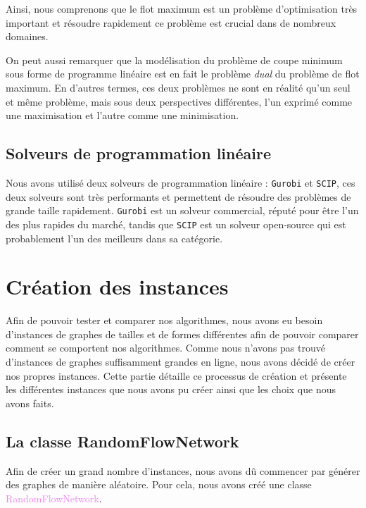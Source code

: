 \documentclass[a4paper]{article}
\begin{document}
Ainsi, nous comprenons que le flot maximum est un problème d'optimisation très important et résoudre rapidement ce problème est crucial dans de nombreux domaines.

On peut aussi remarquer que la modélisation du problème de coupe minimum sous forme de programme linéaire est en fait le problème \emph{dual} du problème de flot maximum. En d'autres termes, ces deux problèmes ne sont en réalité qu'un seul et même problème, mais sous deux perspectives différentes, l'un exprimé comme une maximisation et l'autre comme une minimisation.
\subsection{Solveurs de programmation linéaire}
Nous avons utilisé deux solveurs de programmation linéaire : \texttt{Gurobi} et \texttt{SCIP}, ces deux solveurs sont très performants et permettent de résoudre des problèmes de grande taille rapidement. \texttt{Gurobi} est un solveur commercial, réputé pour être l'un des plus rapides du marché, tandis que \texttt{SCIP} est un solveur open-source qui est probablement l'un des meilleurs dans sa catégorie.


\section{Création des instances}

Afin de pouvoir tester et comparer nos algorithmes, nous avons eu besoin d'instances de graphes de tailles et de formes différentes afin de pouvoir comparer comment se comportent nos algorithmes. Comme nous n'avons pas trouvé d'instances de graphes suffisamment grandes en ligne, nous avons décidé de créer nos propres instances. Cette partie détaille ce processus de création et présente les différentes instances que nous avons pu créer ainsi que les choix que nous avons faits.

\subsection{La classe RandomFlowNetwork}
Afin de créer un grand nombre d'instances, nous avons dû commencer par générer des graphes de manière aléatoire. Pour cela, nous avons créé une classe \textcolor{violet}{RandomFlowNetwork}.\\
\end{document}
